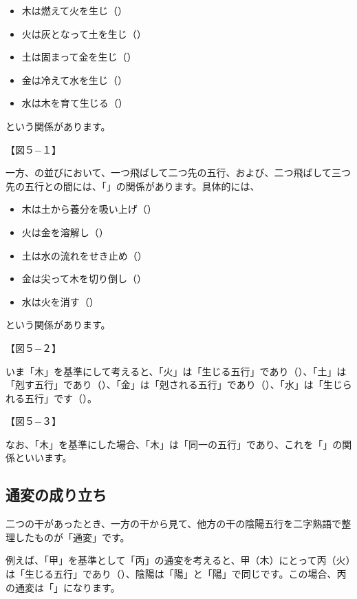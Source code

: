 \documentclass[a5paper,11pt,dvipdfmx]{tarticle}
\begin{document}
\begin{itemize}
\item 木は燃えて火を生じ（）
\item 火は灰となって土を生じ（）
\item 土は固まって金を生じ（）
\item 金は冷えて水を生じ（）
\item 水は木を育て生じる（）
\end{itemize}
という関係があります。

【図５−１】

一方、の並びにおいて、一つ飛ばして二つ先の五行、および、二つ飛ばして三つ先の五行との間には、「」の関係があります。具体的には、
\begin{itemize}
\item 木は土から養分を吸い上げ（）
\item 火は金を溶解し（）
\item 土は水の流れをせき止め（）
\item 金は尖って木を切り倒し（）
\item 水は火を消す（）
\end{itemize}
  
という関係があります。

【図５−２】
  
いま「木」を基準にして考えると、「火」は「生じる五行」であり（）、「土」は「剋す五行」であり（）、「金」は「剋される五行」であり（）、「水」は「生じられる五行」です（）。

【図５−３】

なお、「木」を基準にした場合、「木」は「同一の五行」であり、これを「」の関係といいます。

\subsection{通変の成り立ち}

二つの干があったとき、一方の干から見て、他方の干の陰陽五行を二字熟語で整理したものが「通変」です。

例えば、「甲」を基準として「丙」の通変を考えると、甲（木）にとって丙（火）は「生じる五行」であり（）、陰陽は「陽」と「陽」で同じです。この場合、丙の通変は「」になります。
\end{document}
